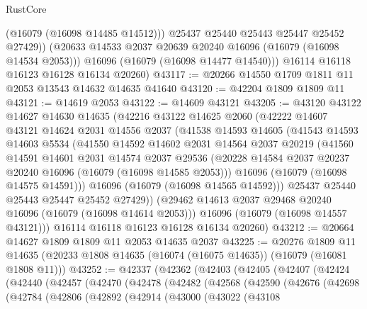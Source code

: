 \begin{lexlean}{RustCore}
\begin{coremodule}
              (@16079 (@16098 @14485 @14512)))
            @25437
            @25440
            @25443
            @25447
            @25452
            @27429))
        (@20633 @14533 @2037 @20639 @20240 @16096 (@16079 (@16098 @14534 @2053)))
        @16096
        (@16079 (@16098 @14477 @14540)))
      @16114
      @16118
      @16123
      @16128
      @16134
      @20260)
@43117 := @20266 @14550 @1709 @1811 @11 @2053 @13543 @14632 @14635 @41640
@43120 := @42204 @1809 @1809 @11
@43121 := @14619 @2053
@43122 := @14609 @43121
@43205 := @43120
    @43122
    @14627
    @14630
    @14635
    (@42216
      @43122
      @14625
      @2060
      (@42222
        @14607
        @43121
        @14624
        @2031
        @14556
        @2037
        (@41538
          @14593
          @14605
          (@41543
            @14593
            @14603
            @5534
            (@41550
              @14592
              @14602
              @2031
              @14564
              @2037
              @20219
              (@41560
                @14591
                @14601
                @2031
                @14574
                @2037
                @29536
                (@20228 @14584 @2037 @20237 @20240 @16096 (@16079 (@16098 @14585 @2053)))
                @16096
                (@16079 (@16098 @14575 @14591)))
              @16096
              (@16079 (@16098 @14565 @14592)))
            @25437
            @25440
            @25443
            @25447
            @25452
            @27429))
        (@29462 @14613 @2037 @29468 @20240 @16096 (@16079 (@16098 @14614 @2053)))
        @16096
        (@16079 (@16098 @14557 @43121)))
      @16114
      @16118
      @16123
      @16128
      @16134
      @20260)
@43212 := @20664 @14627 @1809 @1809 @11 @2053 @14635 @2037
@43225 := @20276
    @1809
    @11
    @14635
    (@20233 @1808 @14635 (@16074 (@16075 @14635)) (@16079 (@16081 @1808 @11)))
@43252 := @42337
    (@42362
      (@42403
        (@42405
          (@42407
            (@42424
              (@42440
                (@42457
                  (@42470
                    (@42478
                      (@42482
                        (@42568
                          (@42590
                            (@42676
                              (@42698
                                (@42784
                                  (@42806
                                    (@42892
                                      (@42914
                                        (@43000
                                          (@43022
                                            (@43108

\end{coremodule}
\end{lexlean}
